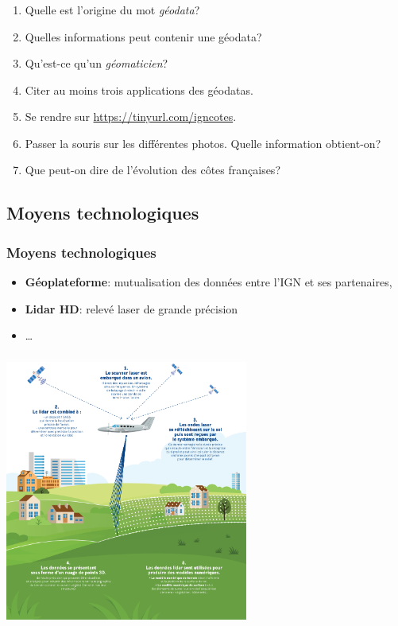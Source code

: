 \documentclass[svgnames,11pt]{beamer}
\begin{document}
\begin{frame}
    \frametitle{}

    \begin{activite}
    \begin{enumerate}
        \item Quelle est l'origine du mot \emph{géodata}?
        \item Quelles informations peut contenir une géodata?
        \item Qu'est-ce qu'un \emph{géomaticien}?
        \item Citer au moins trois applications des géodatas.
        \item Se rendre sur \url{https://tinyurl.com/igncotes}.
        \item Passer la souris sur les différentes photos. Quelle information obtient-on?
        \item Que peut-on dire de l'évolution des côtes françaises?
    \end{enumerate}
    \end{activite}
\end{frame}
\subsection{Moyens technologiques}
\begin{frame}
    \frametitle{Moyens technologiques}
\begin{itemize}
    \item \textbf{Géoplateforme}: mutualisation des données entre l'IGN et ses partenaires,
    \item \textbf{Lidar HD}: relevé laser de grande précision
    \item \dots
\end{itemize}
    

\end{frame}
\begin{frame}
    \frametitle{}

    \begin{center}
        \centering
        \includegraphics[width=8cm]{ressources/lidar.jpg}
        \end{center}
\end{frame}
\end{document}

